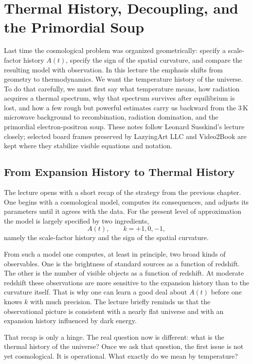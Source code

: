 \chapter{Thermal History, Decoupling, and the Primordial Soup}

Last time the cosmological problem was organized geometrically: specify a scale-factor history \(A(t)\), specify the sign of the spatial curvature, and compare the resulting model with observation. In this lecture the emphasis shifts from geometry to thermodynamics. We want the temperature history of the universe. To do that carefully, we must first say what temperature means, how radiation acquires a thermal spectrum, why that spectrum survives after equilibrium is lost, and how a few rough but powerful estimates carry us backward from the \(3\,\mathrm{K}\) microwave background to recombination, radiation domination, and the primordial electron-positron soup. These notes follow Leonard Susskind's lecture closely; selected board frames preserved by LazyingArt LLC and Video2Book are kept where they stabilize visible equations and notation.

\section{From Expansion History to Thermal History}

The lecture opens with a short recap of the strategy from the previous chapter. One begins with a cosmological model, computes its consequences, and adjusts its parameters until it agrees with the data. For the present level of approximation the model is largely specified by two ingredients,
\begin{equation}
A(t),
\qquad
k = +1,0,-1,
\end{equation}
namely the scale-factor history and the sign of the spatial curvature.

From such a model one computes, at least in principle, two broad kinds of observables. One is the brightness of standard sources as a function of redshift. The other is the number of visible objects as a function of redshift. At moderate redshift these observations are more sensitive to the expansion history than to the curvature itself. That is why one can learn a good deal about \(A(t)\) before one knows \(k\) with much precision. The lecture briefly reminds us that the observational picture is consistent with a nearly flat universe and with an expansion history influenced by dark energy.

That recap is only a hinge. The real question now is different: what is the thermal history of the universe? Once we ask that question, the first issue is not yet cosmological. It is operational. What exactly do we mean by temperature?

